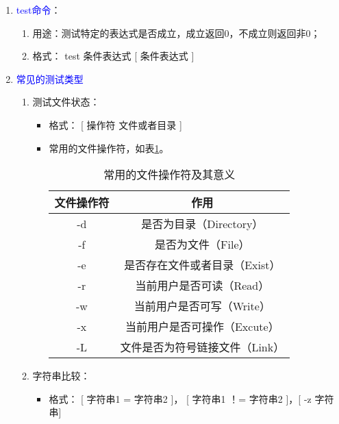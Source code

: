 \begin{enumerate}
  \item \textcolor{blue}{test命令}：
    \begin{enumerate}
      \item 用途：测试特定的表达式是否成立，成立返回0，不成立则返回非0；
      \item 格式： test 条件表达式 [ 条件表达式 ]
    \end{enumerate}
  \item \textcolor{blue}{常见的测试类型}
    \begin{enumerate}
      \item 测试文件状态：
        \begin{itemize}
            \item 格式： [ 操作符 文件或者目录 ]
            \item 常用的文件操作符，如表\ref{tab:test_sign}。
              \begin{table}[h]
               \centering
               \caption{常用的文件操作符及其意义}
                 \begin{tabular*}{1\textwidth}{@{\extracolsep{\fill}}cc}
                 \toprule
                 文件操作符     &作用                            \\
                 \midrule
                 -d            &是否为目录（Directory）          \\
                 -f            &是否为文件（File）               \\
                 -e            &是否存在文件或者目录（Exist）     \\
                 -r            &当前用户是否可读（Read）          \\
                 -w            &当前用户是否可写（Write）         \\
                 -x            &当前用户是否可操作（Excute）      \\
                 -L            &文件是否为符号链接文件（Link）     \\
                 \bottomrule
                 \end{tabular*}%
               \label{tab:test_sign}%
              \end{table}%
            \end{itemize}
      \item 字符串比较：
        \begin{itemize}
                \item 格式： [ 字符串1 = 字符串2 ]， [ 字符串1 ！= 字符串2 ]，[ -z 字符串]

\end{itemize}
\end{enumerate}
\end{enumerate}
